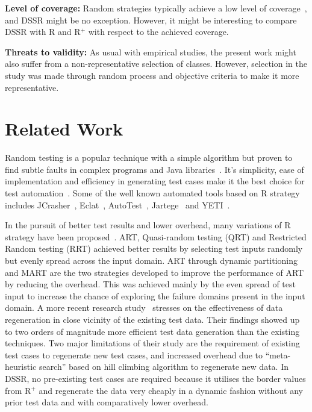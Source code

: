 \textbf{Level of coverage:} Random strategies typically achieve a low level of coverage~\cite{offutt1996semantic}, and DSSR might be no exception. However, it might be interesting to compare DSSR with R and R$^+$ with respect to the achieved coverage.

\textbf{Threats to validity:} As usual with empirical studies, the present work might also suffer from a non-representative selection of classes. However, selection in the study was made through random process and objective criteria to make it more representative.




\section{Related Work}\label{sec:rw}

Random testing is a popular technique with a simple algorithm but proven to find subtle faults in complex programs and Java libraries~\cite{csallner2004jcrasher, pacheco2005eclat,claessen2011quickcheck}. It's simplicity, ease of implementation and efficiency in generating test cases make it the best choice for test automation~\cite{hamlet1994random}. Some of the well known automated tools based on R strategy includes JCrasher~\cite{csallner2004jcrasher}, Eclat~\cite{pacheco2005eclat}, AutoTest~\cite{ciupa2007experimental, ciupa2008artoo}, Jartege~\cite{oriat2005jartege} and YETI~\cite{oriol2010yeti, oriol2012random}.

In the pursuit of better test results and lower overhead, many variations of R strategy have been proposed~\cite{chen2004mirror, chan2006restricted, chen2007quasi, chen2010adaptive, chen2004adaptive}. ART, Quasi-random testing (QRT) and Restricted Random testing (RRT) achieved better results by selecting test inputs randomly but evenly spread across the input domain. ART through dynamic partitioning and MART are the two strategies developed to improve the performance of ART by reducing the overhead. This was achieved mainly by the even spread of test input to increase the chance of exploring the failure domains present in the input domain. A more recent research study~\cite{yoo2012test} stresses on the effectiveness of data regeneration in close vicinity of the existing test data. Their findings showed up to two orders of magnitude more efficient test data generation than the existing techniques. Two major limitations of their study are the requirement of existing test cases to regenerate new test cases, and increased overhead due to ``meta-heuristic search'' based on hill climbing algorithm to regenerate new data. In DSSR, no pre-existing test cases are required because it utilises the border values from R$^+$ and regenerate the data very cheaply in a dynamic fashion without any prior test data and with comparatively lower overhead. 
  
